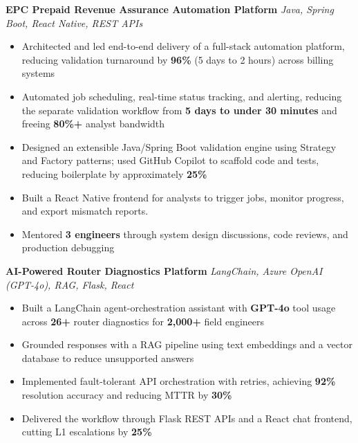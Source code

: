 \documentclass[letterpaper,11pt]{article}
\newcommand{\resumeItem}[1]{
  \item\small{{#1 \vspace{-2pt}}}
}
\newcommand{\resumeItemListStart}{\begin{itemize}}
\newcommand{\resumeItemListEnd}{\end{itemize}\vspace{-5pt}}
\begin{document}
      \vspace{4pt}
      \textbf{\small EPC Prepaid Revenue Assurance Automation Platform} \hfill \textit{\small Java, Spring Boot, React Native, REST APIs} \\
      \vspace{-2pt}
      \resumeItemListStart
        \resumeItem{Architected and led end-to-end delivery of a full-stack automation platform, reducing validation turnaround by \textbf{96\%} (5 days to 2 hours) across billing systems} %
        \resumeItem{Automated job scheduling, real-time status tracking, and alerting, reducing the separate validation workflow from \textbf{5 days to under 30 minutes} and freeing \textbf{80\%+} analyst bandwidth}
        \resumeItem{Designed an extensible Java/Spring Boot validation engine using Strategy and Factory patterns; used GitHub Copilot to scaffold code and tests, reducing boilerplate by approximately \textbf{25\%}}
        \resumeItem{Built a React Native frontend for analysts to trigger jobs, monitor progress, and export mismatch reports.} %
        \resumeItem{Mentored \textbf{3 engineers} through system design discussions, code reviews, and production debugging}
      \resumeItemListEnd

      \vspace{4pt}
      \textbf{\small AI-Powered Router Diagnostics Platform} \hfill \textit{\small LangChain, Azure OpenAI (GPT-4o), RAG, Flask, React} \\
      \vspace{-2pt}
      \resumeItemListStart
        \resumeItem{Built a LangChain agent-orchestration assistant with \textbf{GPT-4o} tool usage across \textbf{26+} router diagnostics for \textbf{2,000+} field engineers}
        \resumeItem{Grounded responses with a RAG pipeline using text embeddings and a vector database to reduce unsupported answers}
        \resumeItem{Implemented fault-tolerant API orchestration with retries, achieving \textbf{92\%} resolution accuracy and reducing MTTR by \textbf{30\%}}
        \resumeItem{Delivered the workflow through Flask REST APIs and a React chat frontend, cutting L1 escalations by \textbf{25\%}}
      \resumeItemListEnd
\end{document}
